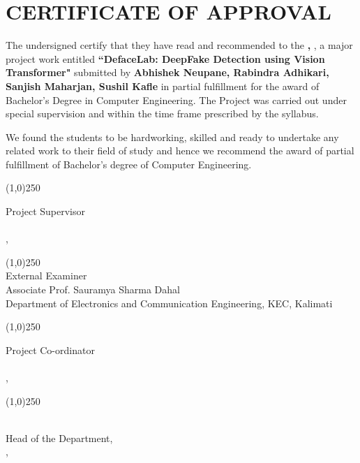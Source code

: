 \section*{CERTIFICATE OF APPROVAL}
\begingroup
\setlength{\parskip}{0pt}

The undersigned certify that they have read and recommended to the \textbf{\thedepartment,  \thecampus}, a major
project work entitled \textbf{“DefaceLab:  DeepFake Detection using Vision Transformer"} submitted by \textbf{Abhishek Neupane, Rabindra Adhikari, Sanjish Maharjan, Sushil Kafle} in partial fulfillment for the award of Bachelor’s
Degree in Computer Engineering. The Project was carried out
under special supervision and within the time frame prescribed by the syllabus.

\vspace{0.3cm}

\noindent We found the students to be hardworking, skilled and ready to undertake any related
work to their field of study and hence we recommend the award of partial fulfillment
of Bachelor’s degree of Computer Engineering.

\vspace{0.5cm}

\noindent \line(1,0){250}

\noindent Project Supervisor \\
\thesupervisor \\
\thedepartment, \thecampus


\vspace{0.4cm}
\noindent \line(1,0){250}\\
\noindent External Examiner \\
Associate Prof. Sauramya Sharma Dahal\\
Department of Electronics and Communication Engineering, KEC, Kalimati


\vspace{0.4cm}
\noindent \line(1,0){250}

\noindent Project Co-ordinator \\
\theprogramcoordinator \\
\thedepartment, \thecampus

\vspace{0.4cm}

\noindent \line(1,0){250}

\noindent \theHOD \\
Head of the Department, \\
\thedepartment, \thecampus

\vspace{0.3cm}

\noindent \thedate
\endgroup